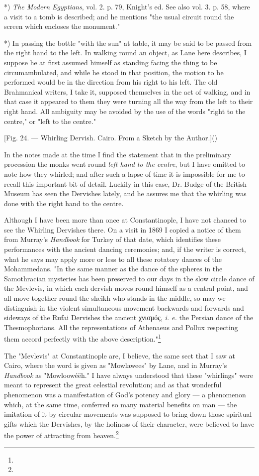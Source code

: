 \documentclass[a4paper, 11pt, oneside, polutonikogreek, english]{article}
\begin{document}
*) \emph{The Modern Egyptians}, vol. 2. p. 79, Knight's ed. See also vol. 3. p. 58, where a visit to a tomb is described; and he mentions "the usual circuit round the screen which encloses the monument."

*) In passing the bottle "with the sun" at table, it may be said to be passed from the right hand to the left. In walking round an object, as Lane here describes, I suppose he at first assumed himself as standing facing the thing to be circumambulated, and while he stood in that position, the motion to be performed would be in the direction from his right to his left. The old Brahmanical writers, I take it, supposed themselves in the act of walking, and in that case it appeared to them they were turning all the way from the left to their right hand. All ambiguity may be avoided by the use of the words "right to the centre," or "left to the centre."

[Fig. 24. --- Whirling Dervish. Cairo. From a Sketch by the Author.]()

In the notes made at the time I find the statement that in the preliminary procession the monks went round \emph{left hand to the centre}, but I have omitted to note how they whirled; and after such a lapse of time it is impossible for me to recall this important bit of detail. Luckily in this case, Dr. Budge of the British Museum has seen the Dervishes lately, and he assures me that the whirling was done with the right hand to the centre.

Although I have been more than once at Constantinople, I have not chanced to see the Whirling Dervishes there. On a visit in 1869 I copied a notice of them from Murray's \emph{Handbook} for Turkey of that date, which identifies these performances with the ancient dancing ceremonies; and, if the writer is correct, what he says may apply more or less to all these rotatory dances of the Mohammedans. "In the same manner as the dance of the spheres in the Samothracian mysteries has been preserved to our days in the slow circle dance of the Mevlevis, in which each dervish moves round himself as a central point, and all move together round the sheikh who stands in the middle, so may we distinguish in the violent simultaneous movement backwards and forwards and sideways of the Rufai Dervishes the ancient χνισμός, \emph{i. e.} the Persian dance of the Thesmophorians. All the representations of Athenaeus and Pollux respecting them accord perfectly with the above description."\footnote{}

The "Mevlevis" at Constantinople are, I believe, the same sect that I saw at Cairo, where the word is given as "Mowlawees" by Lane, and in Murray's \emph{Handbook} as "Mowloowéëh." I have always understood that these "whirlings" were meant to represent the great celestial revolution; and as that wonderful phenomenon was a manifestation of God's potency and glory --- a phenomenon which, at the same time, conferred so many material benefits on man --- the imitation of it by circular movements was supposed to bring down those spiritual gifts which the Dervishes, by the holiness of their character, were believed to have the power of attracting from heaven.\footnote{}
\end{document}
